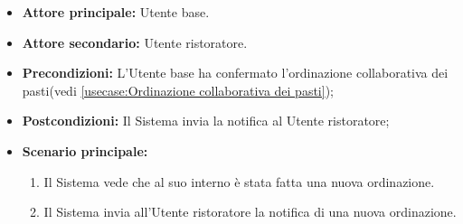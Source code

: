 \label{usecase:Notifica ordine}
\begin{itemize}
	\item \textbf{Attore principale:} Utente base.
	\item \textbf{Attore secondario:} Utente ristoratore.
	
	\item \textbf{Precondizioni:} L'Utente base ha confermato l'ordinazione collaborativa dei pasti(vedi \autoref{usecase:Ordinazione collaborativa dei pasti});

	\item \textbf{Postcondizioni:} Il Sistema invia la notifica al Utente ristoratore;
     
	\item \textbf{Scenario principale:}
	      \begin{enumerate}
                \item Il Sistema vede che al suo interno è stata fatta una nuova ordinazione.
                \item Il Sistema invia all'Utente ristoratore la notifica di una nuova ordinazione.
	      \end{enumerate}
\end{itemize}
